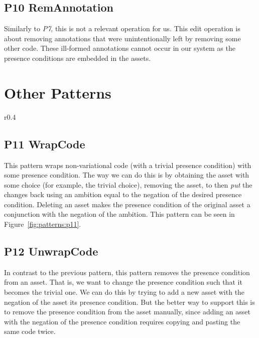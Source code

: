 \subsection*{P10 RemAnnotation}
Similarly to \emph{P7}, this is not a relevant operation for us. This edit
operation is about removing annotations that were unintentionally left by
removing some other code. These ill-formed annotations cannot occur in our
system as the presence conditions are embedded in the assets.

\section{Other Patterns}
\begin{wrapfigure}{r}{0.4\textwidth}
  \centering
  \caption{Workflow for giving an asset a non-trivial presence condition, relevant for pattern \emph{P11}. In this case, we want to give $a_2$ a presence condition of $A$.}
  \label{fig:patterns:p11}
\end{wrapfigure}
\subsection*{P11 WrapCode}
This pattern wraps non-variational code (with a trivial presence condition)
with some presence condition. The way we can do this is by obtaining the asset
with some choice (for example, the trivial choice), removing the asset, to then
\emph{put} the changes back using an ambition equal to the negation of the
desired presence condition. Deleting an asset makes the presence condition of
the original asset a conjunction with the negation of the ambition. This pattern
can be seen in Figure~\ref{fig:patterns:p11}.

\subsection*{P12 UnwrapCode}
In contrast to the previous pattern, this pattern removes the presence condition
from an asset. That is, we want to change the presence condition such that it
becomes the trivial one. We can do this by trying to add a new asset with the
negation of the asset its presence condition. But the better way to support
this is to remove the presence condition from the asset manually, since
adding an asset with the negation of the presence condition requires copying
and pasting the same code twice.

